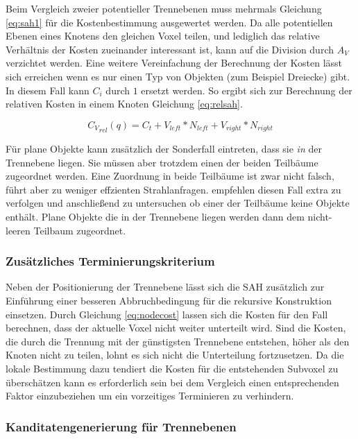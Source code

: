 Beim Vergleich zweier potentieller Trennebenen muss mehrmals Gleichung \ref{eq:sah1} für die Kostenbestimmung ausgewertet werden. Da alle potentiellen Ebenen eines Knotens den gleichen Voxel teilen, und lediglich das relative Verhältnis der Kosten zueinander interessant ist, kann auf die Division durch $A_V$ verzichtet werden. Eine weitere Vereinfachung der Berechnung der Kosten lässt sich erreichen wenn es nur einen Typ von Objekten (zum Beispiel Dreiecke) gibt. In diesem Fall kann $C_i$ durch $1$ ersetzt werden. So ergibt sich zur Berechnung der relativen Kosten in einem Knoten Gleichung \ref{eq:relsah}.

\begin{equation}
{C_V}_{rel}(q) = C_t + V_{left} * N_{left} + V_{right} * N_{right}
 \label{eq:relsah}
\end{equation}

Für plane Objekte kann zusätzlich der Sonderfall eintreten, dass sie \textit{in} der Trennebene liegen. Sie müssen aber trotzdem einen der beiden Teilbäume zugeordnet werden. Eine Zuordnung in beide Teilbäume ist zwar nicht falsch, führt aber zu weniger effzienten Strahlanfragen.
\citep{WaldHavran06} empfehlen diesen Fall extra zu verfolgen und anschließend zu untersuchen ob einer der Teilbäume keine Objekte enthält. Plane Objekte die in der Trennebene liegen werden dann dem nicht-leeren Teilbaum zugeordnet.

\subsubsection{Zusätzliches Terminierungskriterium}

Neben der Positionierung der Trennebene lässt sich die SAH zusätzlich zur Einführung einer besseren Abbruchbedingung für die rekursive Konstruktion einsetzen. Durch Gleichung \ref{eq:nodecost} lassen sich die Kosten für den Fall berechnen, dass der aktuelle Voxel nicht weiter unterteilt wird. Sind die Kosten, die durch die Trennung mit der günstigsten Trennebene entstehen, höher als den Knoten nicht zu teilen, lohnt es sich nicht die Unterteilung fortzusetzen.
Da die lokale Bestimmung dazu tendiert die Kosten für die entstehenden Subvoxel zu überschätzen kann es erforderlich sein bei dem Vergleich einen entsprechenden Faktor einzubeziehen um ein vorzeitiges Terminieren zu verhindern.


\subsubsection{Kanditatengenerierung für Trennebenen}

